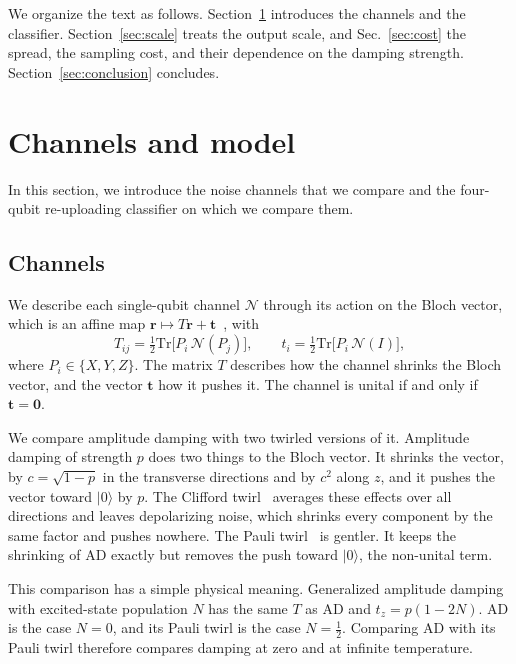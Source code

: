 \documentclass[
 aps,pra,
 twocolumn,
 superscriptaddress,
 longbibliography,
 nofootinbib
]{revtex4-2}
\newcommand{\Tr}{\mathrm{Tr}}
\providecommand{\ket}[1]{\lvert #1 \rangle}
\begin{document}
We organize the text as follows. Section~\ref{sec:setting} introduces the
channels and the classifier. Section~\ref{sec:scale} treats the output scale,
and Sec.~\ref{sec:cost} the spread, the sampling cost, and their dependence on
the damping strength. Section~\ref{sec:conclusion} concludes.

\section{Channels and model}
\label{sec:setting}

In this section, we introduce the noise channels that we compare and the
four-qubit re-uploading classifier on which we compare them.

\subsection{Channels}
\label{sec:channels}

We describe each single-qubit channel $\mathcal N$ through its action on the
Bloch vector, which is an affine map $\mathbf r\mapsto T\mathbf r+\mathbf t$~\cite{nielsen2010quantum}, with
\begin{equation}
T_{ij}=\tfrac12\Tr\bigl[P_i\,\mathcal N(P_j)\bigr],\qquad
t_i=\tfrac12\Tr\bigl[P_i\,\mathcal N(I)\bigr],
\label{eq:bloch}
\end{equation}
where $P_i\in\{X,Y,Z\}$. The matrix $T$ describes how the channel shrinks the
Bloch vector, and the vector $\mathbf t$ how it pushes it. The channel is
unital if and only if $\mathbf t=\mathbf 0$.

We compare amplitude damping with two twirled versions of it. Amplitude damping
of strength $p$ does two things to the Bloch vector. It shrinks the vector, by
$c=\sqrt{1-p}$ in the transverse directions and by $c^2$ along $z$, and it
pushes the vector toward $\ket0$ by $p$. The Clifford twirl~\cite{dankert2009exact}
averages these effects over all directions and leaves depolarizing noise, which
shrinks every component by the same factor and pushes nowhere. The Pauli
twirl~\cite{dur2005standard,wallman2016noise} is gentler. It keeps the
shrinking of AD exactly but removes the push toward $\ket0$, the non-unital
term.

This comparison has a simple physical meaning. Generalized amplitude
damping~\cite{nielsen2010quantum} with excited-state population $N$ has the
same $T$ as AD and $t_z=p(1-2N)$. AD is the case $N=0$, and its Pauli twirl is
the case $N=\frac12$. Comparing AD with its Pauli twirl therefore compares
damping at zero and at infinite temperature.
\end{document}
